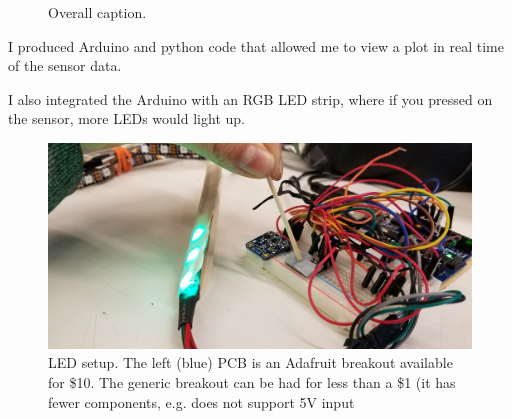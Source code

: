 \documentclass[preprint,12pt,3p]{elsarticle}
\begin{document}
\begin{figure}[htbp]
    \centering 
        \hfil %
        \hfil
        \hfil 
    \caption{ Overall caption.}
\end{figure}

I produced Arduino and python code that allowed me to view a plot in real time of the sensor data.

I also integrated the Arduino with an RGB LED strip, where if you pressed on the sensor,
more LEDs would light up.

\begin{figure}[H]
\centering
\includegraphics[width=.8\textwidth]{images/sensor/poke.jpg}
\caption{LED setup. The left (blue) PCB is an Adafruit breakout available for
\$10. The generic breakout can be had for less than a \$1 (it has fewer
components, e.g. does not support 5V input}
\end{figure}
\end{document}
